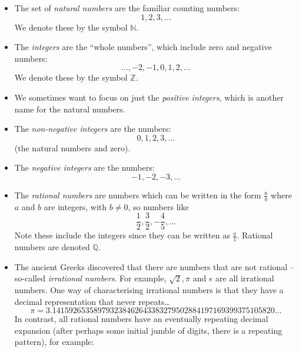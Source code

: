 \documentclass[
]{book}
\theoremstyle{definition}
\theoremstyle{definition}
\theoremstyle{definition}
\theoremstyle{definition}
\theoremstyle{remark}
\begin{document}
\begin{itemize}
\item
  The set of \emph{natural numbers} are the familiar counting numbers:
  \[1, 2, 3,\dotsc\]
  We denote these by the symbol \(\mathbb{N}\).
\item
  The \emph{integers} are the ``whole numbers'', which include zero and negative numbers:
  \[\dots,-2,-1,0,1,2,\dots\]
  We denote these by the symbol \(\mathbb{Z}\).
\item
  We sometimes want to focus on just the \emph{positive integers}, which is another name for the natural numbers.
\item
  The \emph{non-negative integers} are the numbers:
  \[0, 1, 2, 3,\dotsc\]
  (the natural numbers and zero).
\item
  The \emph{negative integers} are the numbers:
  \[-1, -2, -3,\dotsc\]
\item
  The \emph{rational numbers} are numbers which can be written in the form \(\frac{a}{b}\) where \(a\) and \(b\) are integers, with \(b\neq 0\), so numbers like
  \[\frac{1}{2}, \frac{3}{2}, -\frac{4}{5}, \dotsc\]
  Note these include the integers since they can be written as \(\frac{a}{1}\). Rational numbers are denoted \(\mathbb{Q}\).
\item
  The ancient Greeks discovered that there are numbers that are not rational -- so-called \emph{irrational numbers}. For example, \(\sqrt{2}, \pi\) and \(e\) are all irrational numbers. One way of characterising irrational numbers is that they have a decimal representation that never repeats\ldots{}
  \[
    \pi=3.141592653589793238462643383279502884197169399375105820\dots
    \]
  In contrast, all rational numbers have an eventually repeating decimal expansion (after perhaps some initial jumble of digits, there is a repeating pattern), for example:


\end{itemize}
\end{document}

